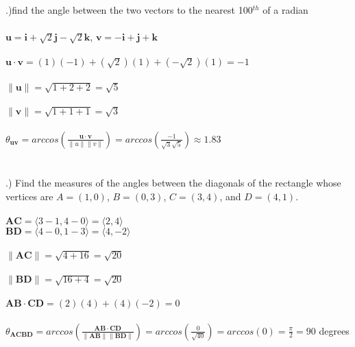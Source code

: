 \documentclass[12pt]{article}
\begin{document}
.)find the angle between the two vectors to the nearest 100$^{th}$ of a radian\\\\
$\mathbf{u} = \mathbf{i} + \sqrt{2}\mathbf{j}-\sqrt{2}\mathbf{k}$, \hspace{10pt} 
$\mathbf{v} = -\mathbf{i}+\mathbf{j} + \mathbf{k}$\\\\
$\mathbf{u \cdot v} = (1)(-1) + (\sqrt{2})(1) + (-\sqrt{2})(1) = -1$\\\\
$\|  \mathbf{u} \| = \sqrt{1 + 2 + 2} = \sqrt{5}$\\\\
$\|  \mathbf{v} \| = \sqrt{1 + 1 + 1} = \sqrt{3}$\\\\
$\theta_{\mathbf{uv}} = arccos(\frac{\mathbf{u \cdot v}}{\|u\| \|v\|}) = arccos(\frac{-1}{\sqrt{3}\sqrt{5}}) \approx 1.83$\\\\\\ \clearpage
{}.) Find the measures of the angles between the diagonals of the rectangle whose vertices are $A = (1,0)$, \hspace{10pt} $B=(0,3)$, \hspace{10pt} $C=(3,4)$, \hspace{10pt} and $D=(4,1)$.\\\\
$\mathbf{AC} = \langle 3 - 1 , 4-0\rangle = \langle 2, 4 \rangle$\\
$\mathbf{BD} = \langle 4 - 0, 1 - 3\rangle = \langle 4, -2\rangle$\\\\
$\| \mathbf{AC} \| = \sqrt{4 + 16} = \sqrt{20}$\\\\
$\| \mathbf{BD} \| = \sqrt{16 + 4} = \sqrt{20}$\\\\
$\mathbf{AB \cdot CD} = (2)(4) + (4)(-2) = 0$\\\\
$\theta_{\mathbf{AC}\mathbf{BD}} = arccos(\frac{\mathbf{AB} \cdot \mathbf{CD}}{\|\mathbf{AB} \| \| \mathbf{BD} \|}) = arccos(\frac{0}{\sqrt{40}}) = arccos(0) = \frac{\pi}{2} = 90$ degrees\\\\
\end{document}
